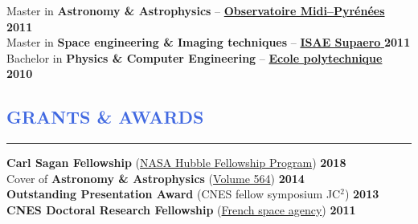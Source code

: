 \documentclass[12pt]{article}
\begin{document}
\vspace{-0.1cm}
Master in \textbf{Astronomy \& Astrophysics}  -- \href{http://www.obs-mip.fr/en}{\textbf{\textbf{Observatoire Midi--Pyr\' en\' ees} }} \hfill  { \bf 2011} \\

\vspace{-0.1cm}
Master in \textbf{Space engineering \& Imaging techniques} -- \href{https://www.isae-supaero.fr/en/}{\textbf{\textbf{ISAE Supaero} }} \hfill  { \bf 2011} \\

\vspace{-0.1cm}
Bachelor in \textbf{Physics \& Computer Engineering} -- \href{http://www.polytechnique.edu/en/}{\textbf{\textbf{Ecole polytechnique} }}  \hfill    { \bf 2010 }\\






\vspace{-0.3cm}
\textcolor{RoyalBlue}{\section{\large GRANTS \& AWARDS}
\vspace{-0.45cm}\hrule}
\vspace{0.4cm}
\textbf{Carl Sagan Fellowship} (\href{http://www.stsci.edu/stsci-research/fellowships/nasa-hubble-fellowship-program}{NASA Hubble Fellowship Program}) \hfill   \textbf{2018}\\ %

\vspace{-0.1cm}
Cover of \textbf{Astronomy \& Astrophysics} (\href{https://www.aanda.org/articles/aa/abs/2014/04/contents/contents.html}{Volume 564}) \hfill  \textbf{2014}\\

\vspace{-0.1cm}
\textbf{Outstanding Presentation Award} (CNES fellow symposium JC$^2$) \hfill   \textbf{2013}\\

\vspace{-0.1cm}
\textbf{CNES Doctoral Research Fellowship} (\href{https://cnes.fr/en/web/CNES-en/7430-research-grants.php}{French space agency})  \hfill   \textbf{2011}\\ %
\end{document}
